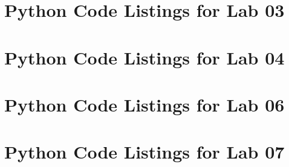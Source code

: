 \clearpage 
\newpage
\vspace{0.25cm}

\label{Ch2:List5}




\clearpage 
\newpage
\chapter{Python Code Listings for Lab 03}

\vspace{0.25cm}

\label{Ch3:List1}




\clearpage 
\newpage
\vspace{0.25cm}
\chapter{Python Code Listings for Lab 04}


\label{Ch4:List1}



\clearpage 
\newpage
\chapter{Python Code Listings for Lab 06}



\label{Ch6:List1}



\clearpage 
\newpage
\chapter{Python Code Listings for Lab 07}


\vspace{0.25cm}

\label{Ch7:List1}


